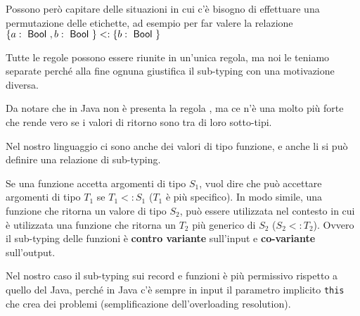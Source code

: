 \noindent Possono però capitare delle situazioni in cui c'è bisogno di effettuare una permutazione delle etichette, ad esempio per far valere la relazione $\{a : \Bool, b: \Bool \} <: \{ b: \Bool\}$
\begin{prooftree}
\end{prooftree}

\noindent Tutte le regole possono essere riunite in un'unica regola, ma noi le teniamo separate perché alla fine ognuna giustifica il sub-typing con una motivazione diversa.

Da notare che in Java non è presenta la regola , ma ce n'è una molto più forte che rende vero se i valori di ritorno sono tra di loro sotto-tipi.

Nel nostro linguaggio ci sono anche dei valori di tipo funzione, e anche li si può definire una relazione di sub-typing.

\begin{prooftree}
\end{prooftree}

\noindent Se una funzione accetta argomenti di tipo $S_1$, vuol dire che può accettare argomenti di tipo $T_1$ se $T_1 <: S_1$ ($T_1$ è più specifico). In modo simile, una funzione che ritorna un valore di tipo $S_2$, può essere utilizzata nel contesto in cui è utilizzata una funzione che ritorna un $T_2$ più generico di $S_2$ ($S_2 <: T_2$). Ovvero il sub-typing delle funzioni è \textbf{contro variante} sull'input e \textbf{co-variante} sull'output.

\begin{prooftree}
\end{prooftree}

\noindent Nel nostro caso il sub-typing sui record e funzioni è più permissivo rispetto a quello del Java, perché in Java c'è sempre in input il parametro implicito \texttt{this} che crea dei problemi (semplificazione dell'overloading resolution).

